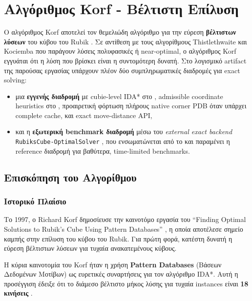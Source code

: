\chapter{Αλγόριθμος Korf - Βέλτιστη Επίλυση}
\label{ch:korf}


Ο αλγόριθμος Korf αποτελεί τον θεμελιώδη αλγόριθμο για την εύρεση
\textbf{βέλτιστων λύσεων} του κύβου του Rubik \cite{korf1997finding}. Σε
αντίθεση με τους αλγορίθμους Thistlethwaite και Kociemba που παράγουν λύσεις
πολυφασικές ή near-optimal, ο αλγόριθμος Korf εγγυάται ότι η λύση που βρίσκει
είναι η συντομότερη δυνατή. Στο λογισμικό artifact της παρούσας εργασίας
υπάρχουν πλέον δύο συμπληρωματικές διαδρομές για exact solving:
\begin{itemize}
    \item μια \textbf{εγγενής διαδρομή} με cubie-level IDA* στο , admissible coordinate heuristics στο , προαιρετική φόρτωση πλήρους native corner PDB όταν υπάρχει complete cache, και exact move-distance API,
    \item και η \textbf{εξωτερική benchmark διαδρομή} μέσω του \emph{external exact backend} \texttt{RubiksCube-OptimalSolver} \cite{kociemba_rubiks_optimal}, που ενσωματώνεται από το  και παραμένει η reference διαδρομή για βαθύτερα, time-limited benchmarks.
\end{itemize}

\section{Επισκόπηση του Αλγορίθμου}

\subsection{Ιστορικό Πλαίσιο}

Το 1997, ο Richard Korf δημοσίευσε την καινοτόμο εργασία του ``Finding Optimal Solutions to Rubik's Cube Using Pattern Databases'' \cite{korf1997finding}, η οποία αποτέλεσε σημείο καμπής στην επίλυση του κύβου του Rubik. Για πρώτη φορά, κατέστη δυνατή η εύρεση βέλτιστων λύσεων για τυχαία ανακατεμένους κύβους.

Η κύρια καινοτομία του Korf ήταν η χρήση \textbf{Pattern Databases} (Βάσεων Δεδομένων Μοτίβων) ως ευρετικές συναρτήσεις για τον αλγόριθμο IDA*. Αυτή η προσέγγιση έδειξε ότι το διάμεσο βέλτιστο μήκος λύσης για τυχαία instances είναι \textbf{18 κινήσεις} \cite{korf1997finding}.


